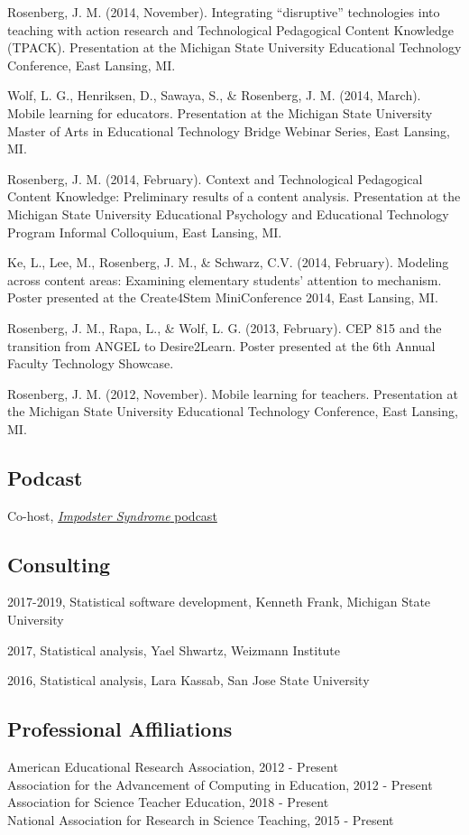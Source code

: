 \documentclass[14,]{article}
\begin{document}
Rosenberg, J. M. (2014, November). Integrating ``disruptive''
technologies into teaching with action research and Technological
Pedagogical Content Knowledge (TPACK). Presentation at the Michigan
State University Educational Technology Conference, East Lansing, MI.

Wolf, L. G., Henriksen, D., Sawaya, S., \& Rosenberg, J. M. (2014,
March). Mobile learning for educators. Presentation at the Michigan
State University Master of Arts in Educational Technology Bridge Webinar
Series, East Lansing, MI.

Rosenberg, J. M. (2014, February). Context and Technological Pedagogical
Content Knowledge: Preliminary results of a content analysis.
Presentation at the Michigan State University Educational Psychology and
Educational Technology Program Informal Colloquium, East Lansing, MI.

Ke, L., Lee, M., Rosenberg, J. M., \& Schwarz, C.V. (2014, February).
Modeling across content areas: Examining elementary students' attention
to mechanism. Poster presented at the Create4Stem MiniConference 2014,
East Lansing, MI.

Rosenberg, J. M., Rapa, L., \& Wolf, L. G. (2013, February). CEP 815 and
the transition from ANGEL to Desire2Learn. Poster presented at the 6th
Annual Faculty Technology Showcase.

Rosenberg, J. M. (2012, November). Mobile learning for teachers.
Presentation at the Michigan State University Educational Technology
Conference, East Lansing, MI.

\hypertarget{podcast}{%
\subsection{Podcast}\label{podcast}}

Co-host, \href{http://impodstersyndrome.libsyn.com/}{\emph{Impodster
Syndrome} podcast}

\hypertarget{consulting}{%
\subsection{Consulting}\label{consulting}}

2017-2019, Statistical software development, Kenneth Frank, Michigan
State University

2017, Statistical analysis, Yael Shwartz, Weizmann Institute

2016, Statistical analysis, Lara Kassab, San Jose State University

\hypertarget{professional-affiliations}{%
\subsection{Professional Affiliations}\label{professional-affiliations}}

American Educational Research Association, 2012 - Present\\
Association for the Advancement of Computing in Education, 2012 -
Present\\
Association for Science Teacher Education, 2018 - Present\\
National Association for Research in Science Teaching, 2015 - Present
\end{document}
